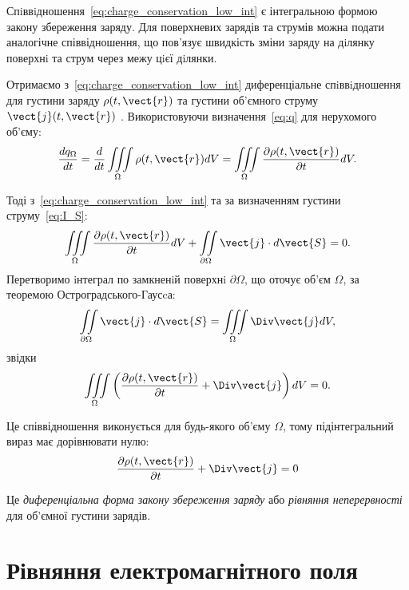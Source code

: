 Спiввiдношення~\eqref{eq:charge_conservation_low_int} є інтегральною формою закону збереження
заряду. Для поверхневих зарядів та струмів можна подати аналогічне
співвідношення, що пов’язує швидкість зміни заряду на дiлянку поверхнi та
струм через межу цiєї дiлянки.

Отримаємо з~\eqref{eq:charge_conservation_low_int} диференціальне спiввiдношення для густини заряду
$\rho(t, \vect{r})$ та густини об'ємного струму $\vect{j}(t, \vect{r})$ . Використовуючи визначення~\eqref{eq:q}
для нерухомого об'єму:
\begin{equation*}
	\frac{dq_{\Omega}}{dt} = \frac{d}{dt} \iiint\limits_{\Omega} \rho(t, \vect{r}) dV = \iiint\limits_{\Omega} \frac{\partial\rho(t, \vect{r})}{\partial
		t} dV.
\end{equation*}

Тоді з~\eqref{eq:charge_conservation_low_int}  та за визначенням густини струму~\eqref{eq:I_S}:
\begin{equation*}
	\iiint\limits_{\Omega} \frac{\partial\rho(t, \vect{r})}{\partial
		t} dV + \iint\limits_{\partial\Omega} \vect{j}\cdot d\vect{S} = 0.
\end{equation*}
Перетворимо iнтеграл по замкненiй поверхнi $\partial\Omega$, що оточує об'єм $\Omega$, за
теоремою Остроградського-Гаусcа:
\begin{equation*}
	\iint\limits_{\partial\Omega} \vect{j}\cdot d\vect{S} = \iiint\limits_{\Omega}\Div\vect{j} dV,
\end{equation*}
звідки
\begin{equation*}
	\iiint\limits_{\Omega} \left(\frac{\partial\rho(t, \vect{r})}{\partial
		t}  +  \Div\vect{j} \right) dV =0.
\end{equation*}

Це співвідношення виконується для будь-якого об'єму $\Omega$, тому
підінтегральний вираз має дорівнювати нулю:
\begin{equation}\label{eq:charge_conservation_low_diff}
	\frac{\partial\rho(t, \vect{r})}{\partial t}  +  \Div\vect{j}  = 0
\end{equation}

Це \emph{диференціальна форма закону збереження заряду} або \emph{рівняння неперервності} для об’ємної густини зарядів.


\section{Рівняння електромагнітного поля}


